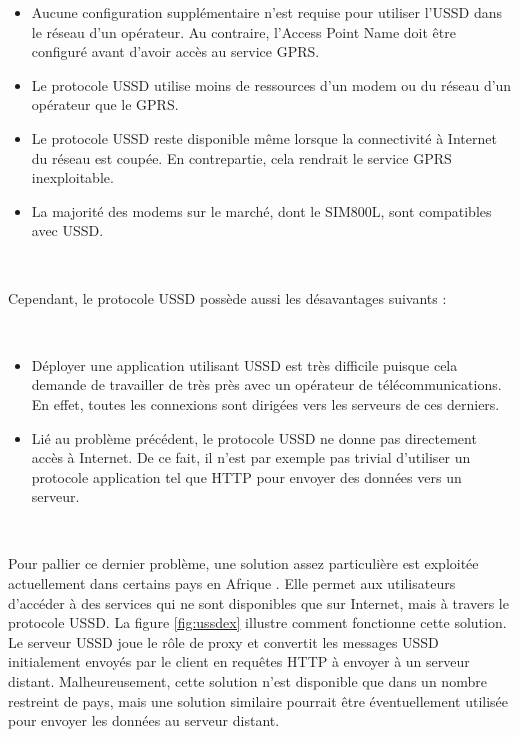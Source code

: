 \begin{itemize}
  \item Aucune configuration supplémentaire n'est requise pour utiliser l'USSD dans le réseau d'un opérateur. Au contraire, l'Access Point Name doit être configuré avant d'avoir accès au service GPRS.

  \item Le protocole USSD utilise moins de ressources d'un modem ou du réseau d'un opérateur que le GPRS. \cite{global_ussd}

  \item Le protocole USSD reste disponible même lorsque la connectivité à Internet du réseau est coupée. En contrepartie, cela rendrait le service GPRS inexploitable.\cite{transport_ussd}

  \item La majorité des modems sur le marché, dont le SIM800L, sont compatibles avec USSD. \cite{lakshmi2017ussd}
\end{itemize}

~

\noindent
Cependant, le protocole USSD possède aussi les désavantages suivants :

~

\begin{itemize}
  \item Déployer une application utilisant USSD est très difficile puisque cela demande de travailler de très près avec un opérateur de télécommunications. En effet, toutes les connexions sont dirigées vers les serveurs de ces derniers. \cite{perrier2015ussd}

  \item Lié au problème précédent, le protocole USSD ne donne pas directement accès à Internet. De ce fait, il n'est par exemple pas trivial d'utiliser un protocole application tel que HTTP pour envoyer des données vers un serveur.
\end{itemize}

~

\noindent
Pour pallier ce dernier problème, une solution assez particulière est exploitée actuellement dans certains pays en Afrique \cite{africa_ussd}. Elle permet aux utilisateurs d'accéder à des services qui ne sont disponibles que sur Internet, mais à travers le protocole USSD. La figure \ref{fig:ussdex} illustre comment fonctionne cette solution. Le serveur USSD joue le rôle de proxy et convertit les messages USSD initialement envoyés par le client en requêtes HTTP à envoyer à un serveur distant. Malheureusement, cette solution n'est disponible que dans un nombre restreint de pays, mais une solution similaire pourrait être éventuellement utilisée pour envoyer les données au serveur distant.

